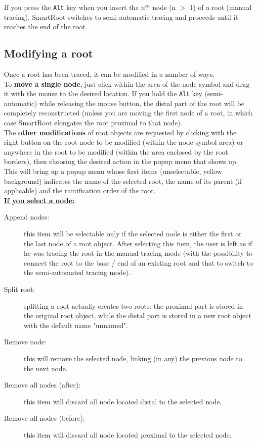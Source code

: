 \documentclass[a4paper,english,10pt]{report}
\begin{document}
If you press the {\color{coolBlue}\verb|Alt|} key when you insert the $n^{th}$ node (n $>$ 1) of a root (manual tracing), SmartRoot switches to semi-automatic tracing and proceeds until it reaches the end of the root.

\newpage
\subsection{Modifying a root}
\label{modify}

Once a root has been traced, it can be modified in a number of ways.\\

To \textbf{move a single node}, just click within the area of the node symbol and drag it with the mouse to the desired location. If you hold the {\color{coolBlue}\verb|Alt|} key (semi-automatic) while releasing the mouse button, the distal part of the root will be completely reconstructed (unless you are moving the first node of a root, in which case SmartRoot elongates the root proximal to that node).\\
 
The \textbf{other modifications} of root objects are requested by clicking with the right button on the root node to be modified (within the node symbol area) or anywhere in the root to be modified (within the area enclosed by the root borders), then choosing the desired action in the popup menu that shows up. This will bring up a popup menu whose first items (unselectable, yellow background) indicates the name of the selected root, the name of its parent (if applicable) and the ramification order of the root.\\


\noindent \underline{\textbf{If you select a node:}}\\

\begin{description}
\item[Append nodes:] this item will be selectable only if the selected node is either the first or the last node of a root object. After selecting this item, the user is left as if he was tracing the root in the manual tracing mode (with the possibility to connect the root to the base / end of an existing root and that to switch to the semi-automated tracing mode).
\item[Split root:] splitting a root actually creates two roots: the proximal part is stored in the original root object, while the distal part is stored in a new root object with the default name "unnamed".
\item[Remove node:] this will remove the selected node, linking (in any) the previous node to the next node.
\item[Remove all nodes (after):] this item will discard all node located distal to the selected node.
\item[Remove all nodes (before):] this item will discard all node located proximal to the selected node.\\
\end{description}
\end{document}
